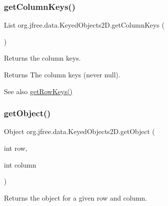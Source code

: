 \subsubsection{\texorpdfstring{get\+Column\+Keys()}{getColumnKeys()}}
{\footnotesize\ttfamily List org.\+jfree.\+data.\+Keyed\+Objects2\+D.\+get\+Column\+Keys (\begin{DoxyParamCaption}{ }\end{DoxyParamCaption})}

Returns the column keys.

\begin{DoxyReturn}{Returns}
The column keys (never {\ttfamily null}).
\end{DoxyReturn}
\begin{DoxySeeAlso}{See also}
\mbox{\hyperlink{classorg_1_1jfree_1_1data_1_1_keyed_objects2_d_ac800d5499d80a223b6f82adadda2066e}{get\+Row\+Keys()}} 
\end{DoxySeeAlso}
\mbox{\label{classorg_1_1jfree_1_1data_1_1_keyed_objects2_d_a4724a62d9e105b7cc3894aa454903082}} 
\subsubsection{\texorpdfstring{get\+Object()}{getObject()}\hspace{0.1cm}{\footnotesize\ttfamily [1/2]}}
{\footnotesize\ttfamily Object org.\+jfree.\+data.\+Keyed\+Objects2\+D.\+get\+Object (\begin{DoxyParamCaption}\item[{int}]{row,  }\item[{int}]{column }\end{DoxyParamCaption})}

Returns the object for a given row and column.


